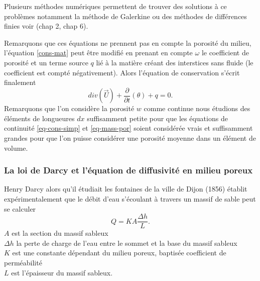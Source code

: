 \documentclass[a4paper,10pt]{article}
\begin{document}
Plusieurs méthodes numériques permettent de trouver des solutions à ce problèmes notamment la méthode de Galerkine ou des méthodes de différences finies voir \cite{allaire2005analyse} (chap 2, chap 6). 

\vspace{7mm}
Remarquons que ces équations ne prennent pas en compte la porosité du milieu, l'équation \eqref{cons-mat} peut être modifié en prenant en compte $\omega$ le coefficient de porosité et un terme source $q$ lié à la matière créant des interstices sans fluide (le coefficient est compté négativement). Alors l'équation de conservation s'écrit finalement
\begin{equation}
	\label{eq-mass-por}
	div(\overrightarrow{U})+\frac{\partial}{\partial t}(\theta)+ q=0.
\end{equation}
Remarquons que l'on considère la porosité $w$ comme continue nous étudions des éléments de longueures $dx$ suffisamment petite pour que les équations de continuité \eqref{eq-cons-simp} et \eqref{eq-mass-por} soient considérée vrais et suffisamment grandes pour que l'on puisse considérer une porosité moyenne dans un élément de volume.

\subsubsection{La loi de Darcy et l'équation de diffusivité en milieu poreux}
\label{Darcy}
Henry Darcy alors qu'il étudiait les fontaines de la ville de Dijon (1856) établit expérimentalement que le débit d'eau s'écoulant à travers un massif de sable peut se calculer
\begin{equation}
	Q=KA\frac{\Delta h}{L}.
\end{equation}
$A$ est la section du massif sableux\\
$\Delta h$ la perte de charge de l'eau entre le sommet et la base du massif sableux\\
$K$ est une constante dépendant du milieu poreux, baptisée coefficient de perméabilité\\
$L$ est l'épaisseur du massif sableux.
\end{document}

